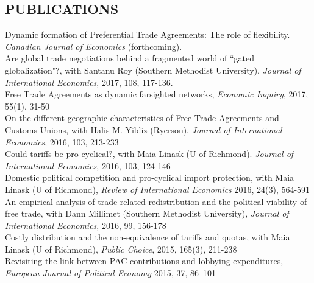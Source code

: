 \documentclass[11pt]{res}
\begin{document}
\begin{resume}
\section{PUBLICATIONS}\vspace{1.5mm}
{Dynamic formation of Preferential Trade Agreements: The role of flexibility}. \emph{Canadian Journal of Economics} (forthcoming). \vspace{1.5mm}\\
{Are global trade negotiations behind a fragmented world of ``gated globalization"?}, with Santanu Roy (Southern Methodist University). \emph{Journal of International Economics}, 2017, 108, 117-136.\vspace{1.5mm}\\
{ Free Trade Agreements as dynamic farsighted networks}, \emph{Economic Inquiry}, 2017, 55(1), 31-50\vspace{1.5mm}\\
{On the different geographic characteristics of Free Trade Agreements and Customs Unions}, with Halis M. Yildiz (Ryerson). \emph{Journal of International Economics}, 2016, 103, 213-233 \vspace{1.5mm}\\
{Could tariffs be pro-cyclical?}, with Maia Linask (U of Richmond). \emph{Journal of International Economics}, 2016, 103, 124-146 \vspace{1.5mm}\\
{Domestic political competition and pro-cyclical import protection}, with Maia Linask (U of Richmond), \emph{Review of International Economics} 2016, 24(3), 564-591\vspace{1.5mm}\\


\phantom{.}\vspace{0.5cm}
{An empirical analysis of trade related redistribution and the political viability of free trade}, with Dann Millimet (Southern Methodist University), \emph{Journal of International Economics}, 2016, 99, 156-178 \vspace{1.5mm}\\
{Costly distribution and the non-equivalence of tariffs and quotas}, with Maia Linask (U of Richmond), \emph{Public Choice}, 2015, 165(3), 211-238 \vspace{1.5mm}\\
{Revisiting the link between PAC contributions and lobbying expenditures, \emph{European Journal of Political Economy}} 2015, 37, 86--101 \vspace{1.5mm}\\


\end{resume}
\end{document}
